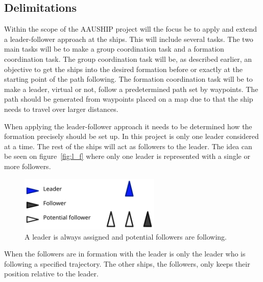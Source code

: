 
\subsection{Delimitations}
Within the scope of the AAUSHIP project will the focus be to apply and extend a leader-follower approach at the ships. This will include several tasks. The two main tasks will be to make a group coordination task and a formation coordination task. The group coordination task will be, as described earlier, an objective to get the ships into the desired formation before or exactly at the starting point of the path following. The formation coordination task will be to make a leader, virtual or not, follow a predetermined path set by waypoints. The path should be generated from waypoints placed on a map due to that the ship needs to travel over larger distances.

When applying the leader-follower approach it needs to be determined how the formation precisely should be set up. In this project is only one leader considered at a time. The rest of the ships will act as followers to the leader. The idea can be seen on figure~\vref{fig:l_f} where only one leader is represented with a single or more followers.
\begin{figure}[htbp]
	\centering
	\includegraphics[width=0.6\textwidth]{fig/lead_follow}
	\caption{A leader is always assigned and potential followers are following.}
	\label{fig:l_f}
\end{figure}
When the followers are in formation with the leader is only the leader who is following a specified trajectory. The other ships, the followers, only keeps their position relative to the leader. 
